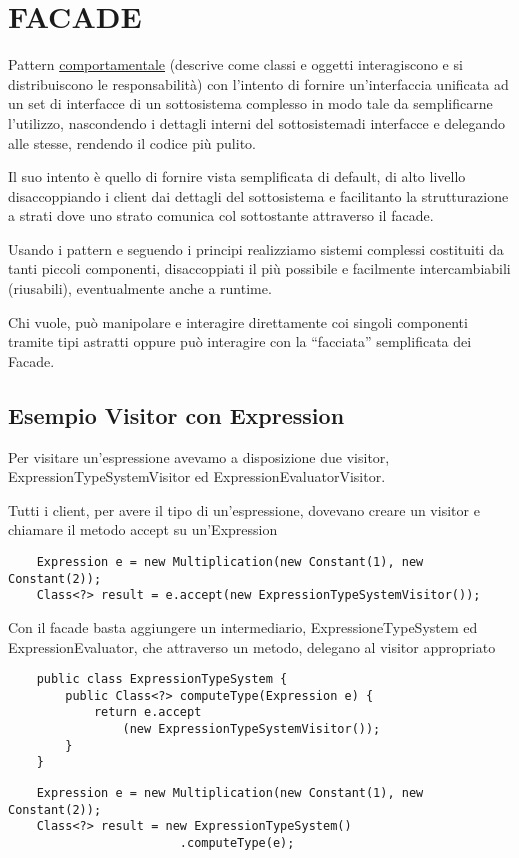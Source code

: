 \chapter{FACADE}

Pattern \underline{comportamentale} (descrive come classi e oggetti interagiscono e si distribuiscono le responsabilità) con l'intento di fornire un'interfaccia 
unificata ad un set di interfacce di un sottosistema complesso in modo tale da semplificarne l'utilizzo, nascondendo i dettagli interni del sottosistemadi 
interfacce e delegando alle stesse, rendendo il codice più pulito.

Il suo intento è quello di fornire vista semplificata di default, di alto livello disaccoppiando i client dai dettagli del sottosistema e facilitanto la 
strutturazione a strati dove uno strato comunica col sottostante attraverso il facade.

Usando i pattern e seguendo i principi realizziamo sistemi complessi costituiti da tanti piccoli componenti, disaccoppiati il più possibile e facilmente 
intercambiabili (riusabili), eventualmente anche a runtime.

Chi vuole, può manipolare e interagire direttamente coi singoli componenti tramite tipi astratti oppure può interagire con la “facciata” semplificata dei Facade.

\section{Esempio Visitor con Expression}

Per visitare un'espressione avevamo a disposizione due visitor, ExpressionTypeSystemVisitor ed ExpressionEvaluatorVisitor.

Tutti i client, per avere il tipo di un’espressione, dovevano creare un visitor e chiamare il metodo accept su un'Expression
\begin{lstlisting}
    Expression e = new Multiplication(new Constant(1), new Constant(2));
    Class<?> result = e.accept(new ExpressionTypeSystemVisitor());
\end{lstlisting}

Con il facade basta aggiungere un intermediario, ExpressioneTypeSystem ed ExpressionEvaluator, che attraverso un metodo, delegano al visitor appropriato
\begin{multicols}{2}
\begin{lstlisting}
    public class ExpressionTypeSystem {
        public Class<?> computeType(Expression e) {
            return e.accept
                (new ExpressionTypeSystemVisitor());
        }
    }
\end{lstlisting}
\columnbreak
\begin{lstlisting}
    Expression e = new Multiplication(new Constant(1), new Constant(2));
    Class<?> result = new ExpressionTypeSystem()
                        .computeType(e);
\end{lstlisting}
\end{multicols}

